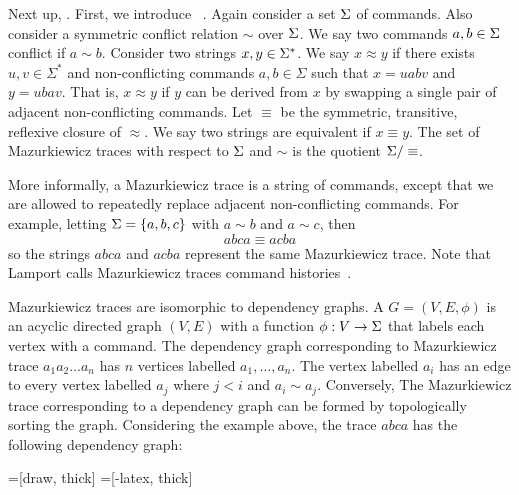 \newcommand{\conflict}{\sim}
Next up, . First, we
introduce ~\cite{mazurkiewicz1986trace}. Again
consider a set $\Sigma$ of commands. Also consider a symmetric conflict relation
$\conflict$ over $\Sigma$. We say two commands $a, b \in \Sigma$ conflict if $a
\conflict b$. Consider two strings $x, y \in \Sigma^*$. We say $x \approx y$ if
there exists $u, v \in \Sigma^*$ and non-conflicting commands $a, b \in \Sigma$
such that $x = uabv$ and $y=ubav$. That is, $x \approx y$ if $y$ can be derived
from $x$ by swapping a single pair of adjacent non-conflicting commands. Let
$\equiv$ be the symmetric, transitive, reflexive closure of $\approx$. We say
two strings are equivalent if $x \equiv y$. The set of Mazurkiewicz traces with
respect to $\Sigma$ and $\conflict$ is the quotient $\Sigma/\equiv$.

More informally, a Mazurkiewicz trace is a string of commands, except that we
are allowed to repeatedly replace adjacent non-conflicting commands. For
example, letting $\Sigma = \{a, b, c\}$ with $a \conflict b$ and $a \conflict
c$, then
\[
  abca \equiv acba
\]
so the strings $abca$ and $acba$ represent the same Mazurkiewicz trace. Note
that Lamport calls Mazurkiewicz traces command
histories~\cite{lamport2005generalized}.

Mazurkiewicz traces are isomorphic to dependency graphs. A  $G = (V, E, \phi)$ is an acyclic directed graph $(V, E)$ with a function
$\phi: V \to \Sigma$ that labels each vertex with a command. The dependency graph
corresponding to Mazurkiewicz trace $a_1 a_2 \ldots a_n$ has $n$ vertices
labelled $a_1, \ldots, a_n$. The vertex labelled $a_i$ has an edge to every
vertex labelled $a_j$ where $j < i$ and $a_i \conflict a_j$. Conversely, The
Mazurkiewicz trace corresponding to a dependency graph can be formed by
topologically sorting the graph. Considering the example above, the trace
$abca$ has the following dependency graph:
\begin{center}
  =[draw, thick]
  =[-latex, thick]
\end{center}

